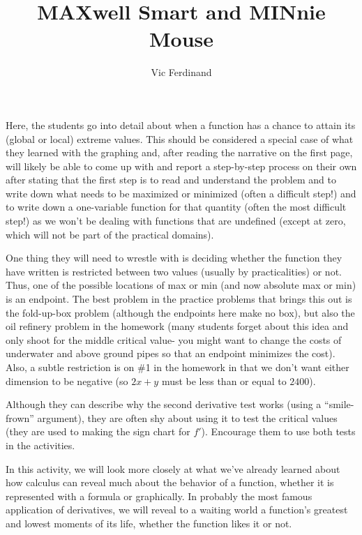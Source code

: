 \documentclass{ximera}
\author{Vic Ferdinand}
\title{MAXwell Smart and MINnie Mouse}
\begin{document}
\begin{abstract}
\end{abstract}
\maketitle

\begin{instructorIntro}
Here, the students go into detail about when a function has a chance to attain its (global or local) extreme values.  This should be considered a special case of what they learned with the graphing and, after reading the narrative on the first page, will likely be able to come up with and report a step-by-step process on their own after stating that the first step is to read and understand the problem and to write down what needs to be maximized or minimized (often a difficult step!) and to write down a one-variable function for that quantity (often the most difficult step!) as we won't be dealing with functions that are undefined (except at zero, which will not be part of the practical domains).

One thing they will need to wrestle with is deciding whether the function they have written is restricted between two values (usually by practicalities) or not.  Thus, one of the possible locations of max or min (and now absolute max or min) is an endpoint.  The best problem in the practice problems that brings this out is the fold-up-box problem (although the endpoints here make no box), but also the oil refinery problem in the homework (many students forget about this idea and only shoot for the middle critical value- you might want to change the costs of underwater and above ground pipes so that an endpoint minimizes the cost).  Also, a subtle restriction is on \#1 in the homework in that we don't want either dimension to be negative (so $2x + y$ must be less than or equal to $2400$).

Although they can describe why the second derivative test works (using a ``smile-frown'' argument), they are often shy about using it to test the critical values (they are used to making the sign chart for $f'$).  Encourage them to use both tests in the activities.

\end{instructorIntro}


In this activity, we will look more closely at what we've already learned about how calculus can reveal much about the behavior of a function, whether it is represented with a formula or graphically.  In probably the most famous application of derivatives, we will reveal to a waiting world a function's greatest and lowest moments of its life, whether the function likes it or not.
\end{document}
